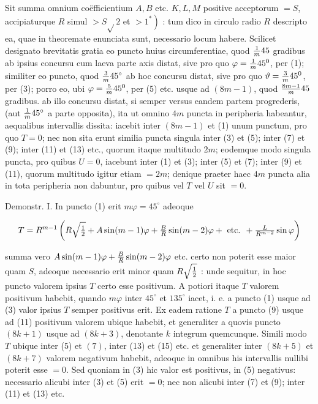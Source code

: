 \documentclass[twoside,12pt, showframe]{memoir}
\let\oldfrac\frac
\def\frac#1#2{\mathchoice{\tfrac{#1}{#2}}{\oldfrac{#1}{#2}}{\genfrac{}{}{}{2}{#1}{#2\mathstrut}}{\genfrac{}{}{}{3}{#1}{#2\mathstrut}}}
\begin{document}
Sit summa omnium coëfficientium \(A, B\) etc. \(K, L, M\) positive acceptorum \(=S\), accipiaturque \(R\) simul \(>S \sqrt{ } 2\) et \(\left.>1^{*}\right)\) : tum dico in circulo radio \(R\) descripto ea, quae in theoremate enunciata sunt, necessario locum habere. Scilicet designato brevitatis gratia eo puncto huius circumferentiae, quod \(\frac{1}{m} 45\) gradibus ab ipsius concursu cum laeva parte axis distat, sive pro quo \(\varphi=\frac{1}{m} 45^{0}\), per (1); similiter eo puncto, quod \(\frac{3}{m} 45^{\circ}\) ab hoc concursu distat, sive pro quo \(\vartheta=\frac{3}{m} 45^{0}\), per (3); porro eo, ubi \(\varphi=\frac{5}{m} 45^{0}\), per (5) etc. usque ad \((8 m-1)\), quod \(\frac{8 m-1}{m} 45\) gradibus. ab illo concursu distat, si semper versus eandem partem progrederis, (aut \(\frac{1}{m} 45^{\circ}\) a parte opposita), ita ut omnino \(4 m\) puncta in peripheria habeantur, aequalibus intervallis dissita: iacebit inter \((8 m-1)\) et (1) unum punctum, pro quo \(T=0\); nec non sita erunt similia puncta singula inter (3) et (5); inter (7) et (9); inter (11) et (13) etc., quorum itaque multitudo \(2 m\); eodemque modo singula puncta, pro quibus \(U=0\), iacebunt inter (1) et (3); inter (5) et (7); inter (9) et (11), quorum multitudo igitur etiam \(=2 m\); denique praeter haec \(4 m\) puncta alia in tota peripheria non dabuntur, pro quibus vel \(T\) vel \(U\) sit \(=0\).

Demonstr. I. In puncto (1) erit \(m \varphi=45^{\circ}\) adeoque

\[
T=R^{m-1}\left(R \sqrt{\frac{1}{2}}+A \sin (m-1) \varphi+\frac{B}{R} \sin (m-2) \varphi+\text { etc. }+\frac{L}{R^{m-2}} \sin \varphi\right)
\]

summa vero \(A \sin (m-1) \varphi+\frac{B}{R} \sin (m-2) \varphi\) etc. certo non poterit esse maior quam \(S\), adeoque necessario erit minor quam \(R \sqrt{\frac{1}{2}}\) : unde sequitur, in hoc puncto valorem ipsius \(T\) certo esse positivum. A potiori itaque \(T\) valorem positivum habebit, quando \(m \varphi\) inter \(45^{\circ}\) et \(135^{\circ}\) iacet, i. e. a puncto (1) usque ad (3) valor ipsius \(T\) semper positivus erit. Ex eadem ratione \(T\) a puncto (9) usque ad (11) positivum valorem ubique habebit, et generaliter a quovis puncto \((8 k+1)\) usque ad \((8 k+3)\), denotante \(k\) integrum quemcunque. Simili modo \(T\) ubique inter (5) et \((7)\), inter (13) et (15) etc. et generaliter inter \((8 k+5)\) et \((8 k+7)\) valorem negativum habebit, adeoque in omnibus his intervallis nullibi poterit esse \(=0\). Sed quoniam in (3) hic valor est positivus, in (5) negativus: necessario alicubi inter (3) et (5) erit \(=0\); nec non alicubi inter (7) et (9); inter (11) et (13) etc.
\end{document}
